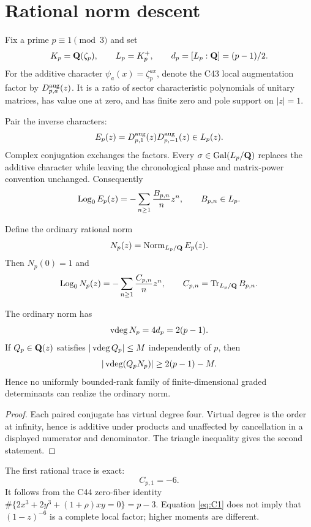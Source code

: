 \section{Rational norm descent}

Fix a prime $p\equiv1\pmod3$ and set
\[
 K_p=\mathbf Q(\zeta_p),\qquad L_p=K_p^+,
 \qquad d_p=[L_p:\mathbf Q]=(p-1)/2.
\]
For the additive character $\psi_a(x)=\zeta_p^{ax}$, denote the C43 local
augmentation factor by $D_{p,a}^{\rm aug}(z)$.  It is a ratio of sector
characteristic polynomials of unitary matrices, has value one at zero, and
has finite zero and pole support on $|z|=1$.

Pair the inverse characters:
\[
 E_p(z)=D_{p,1}^{\rm aug}(z)D_{p,-1}^{\rm aug}(z)\in L_p(z).
\]
Complex conjugation exchanges the factors.  Every
$\sigma\in\operatorname{Gal}(L_p/\mathbf Q)$ replaces the additive character while
leaving the chronological phase and matrix-power convention unchanged.
Consequently
\[
 \operatorname{Log}_0 E_p(z)=-\sum_{n\ge1}\frac{B_{p,n}}n z^n,
 \qquad B_{p,n}\in L_p.
\]

Define the ordinary rational norm
\[
 N_p(z)=\operatorname{Norm}_{L_p/\mathbf Q}E_p(z).
\]
Then $N_p(0)=1$ and
\[
 \operatorname{Log}_0 N_p(z)=-\sum_{n\ge1}\frac{C_{p,n}}n z^n,
 \qquad C_{p,n}=\operatorname{Tr}_{L_p/\mathbf Q}B_{p,n}.
\]

\begin{proposition}\label{prop:vdeg}
The ordinary norm has
\[
 \operatorname{vdeg} N_p=4d_p=2(p-1).
\]
If $Q_p\in\mathbf Q(z)$ satisfies $|\operatorname{vdeg} Q_p|\le M$ independently of $p$, then
\[
 |\operatorname{vdeg}(Q_pN_p)|\ge2(p-1)-M.
\]
Hence no uniformly bounded-rank family of finite-dimensional graded
determinants can realize the ordinary norm.
\end{proposition}

\begin{proof}
Each paired conjugate has virtual degree four.  Virtual degree is the order at
infinity, hence is additive under products and unaffected by cancellation in
a displayed numerator and denominator.  The triangle inequality gives the
second statement.
\end{proof}

The first rational trace is exact:
\begin{equation}\label{eq:C1}
 C_{p,1}=-6.
\end{equation}
It follows from the C44 zero-fiber identity
$\#\{2x^3+2y^3+(1+\rho)xy=0\}=p-3$.  Equation \eqref{eq:C1} does not imply
that $(1-z)^{-6}$ is a complete local factor; higher moments are different.

